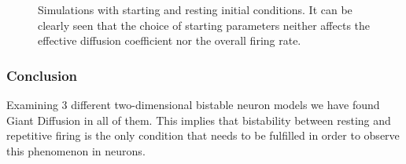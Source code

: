 \documentclass[12pt,a4paper]{article}
\begin{document}
\begin{figure}[H]
	\hspace*{-0.5cm}
	\caption{Simulations with starting and resting initial conditions. It can be clearly seen that the choice of starting parameters neither affects the effective diffusion coefficient nor the overall firing rate.}
	\label{icrinzel}
\end{figure}
\subsubsection{Conclusion}
Examining 3 different two-dimensional bistable neuron models we have found Giant Diffusion in all of them. This implies that bistability between resting and repetitive firing is the only condition that needs to be fulfilled in order to observe this phenomenon in neurons.
\newpage
\end{document}
